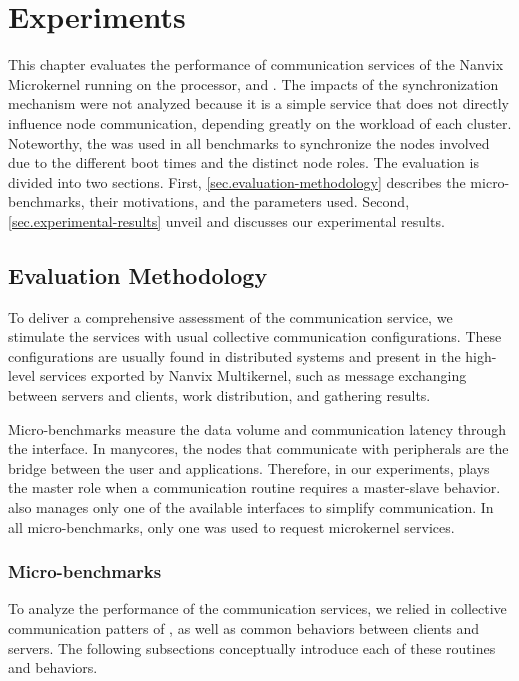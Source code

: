 \chapter{Experiments}
\label{ch.experiments}

	This chapter evaluates the performance of communication services of
	the Nanvix Microkernel running on the \mppa processor, \ie \mailbox
	and \portal. The impacts of the synchronization mechanism were not
	analyzed because it is a simple service that does not directly
	influence node communication, depending greatly on the workload of
	each cluster. Noteworthy, the \sync was used in all benchmarks to
	synchronize the nodes involved due to the different boot times and
	the distinct node roles. The evaluation is divided into two sections.
	First, \autoref{sec.evaluation-methodology} describes the
	micro-benchmarks, their motivations, and the parameters used. Second,
	\autoref{sec.experimental-results} unveil and discusses our
	experimental results.

	\section{Evaluation Methodology}
	\label{sec.evaluation-methodology}

		To deliver a comprehensive assessment of the communication service, we
		stimulate the services with usual collective communication configurations.
		These configurations are usually found in distributed systems and present
		in the high-level services exported by Nanvix Multikernel, such as
		message exchanging between servers and clients, work distribution, and
		gathering results.

        Micro-benchmarks measure the data volume and communication latency
		through the \ioctl interface. In manycores, the nodes that communicate
		with peripherals are the bridge between the user and applications.
		Therefore, in our experiments, \iocluster plays the master role when a
		communication routine requires a master-slave behavior. \ioclusters also
		manages only one of the available interfaces to simplify communication.
		In all micro-benchmarks, only one \pe was used to request microkernel
		services.

		\subsection{Micro-benchmarks}

			To analyze the performance of the communication services, we
			relied in collective communication patters of \mpi, as well as
			common behaviors between clients and servers. The following
			subsections conceptually introduce each of these routines and
			behaviors.

